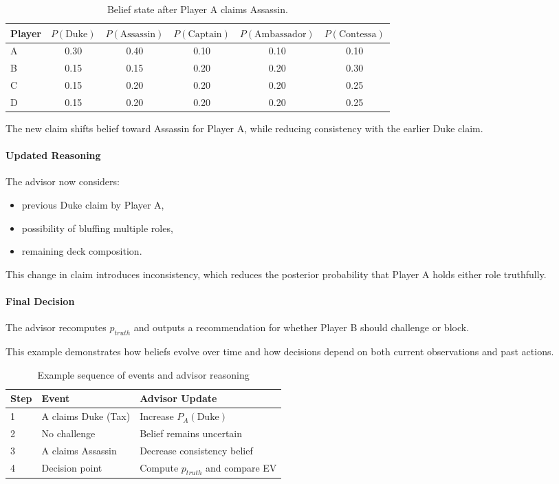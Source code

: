 \documentclass[11pt]{article}
\begin{document}
\begin{table}[H]
\centering
\caption{Belief state after Player A claims Assassin.}
\label{tab:belief-assassin}
\begin{tabular}{lccccc}
\toprule
Player & $P(\mathrm{Duke})$ & $P(\mathrm{Assassin})$ & $P(\mathrm{Captain})$ & $P(\mathrm{Ambassador})$ & $P(\mathrm{Contessa})$ \\
\midrule
A & 0.30 & 0.40 & 0.10 & 0.10 & 0.10 \\
B & 0.15 & 0.15 & 0.20 & 0.20 & 0.30 \\
C & 0.15 & 0.20 & 0.20 & 0.20 & 0.25 \\
D & 0.15 & 0.20 & 0.20 & 0.20 & 0.25 \\
\bottomrule
\end{tabular}
\end{table}
The new claim shifts belief toward Assassin for Player A, while reducing consistency with the earlier Duke claim.

\paragraph{Updated Reasoning}
The advisor now considers:
\begin{itemize}
    \item previous Duke claim by Player A,
    \item possibility of bluffing multiple roles,
    \item remaining deck composition.
\end{itemize}

This change in claim introduces inconsistency, which reduces the posterior probability that Player A holds either role truthfully.

\paragraph{Final Decision}
The advisor recomputes $p_{truth}$ and outputs a recommendation for whether Player B should challenge or block.

This example demonstrates how beliefs evolve over time and how decisions depend on both current observations and past actions.

\begin{table}[h]
\centering
\begin{tabular}{l l l}
\hline
Step & Event & Advisor Update \\
\hline
1 & A claims Duke (Tax) & Increase $P_A(\mathrm{Duke})$ \\
2 & No challenge & Belief remains uncertain \\
3 & A claims Assassin & Decrease consistency belief \\
4 & Decision point & Compute $p_{truth}$ and compare EV \\
\hline
\end{tabular}
\caption{Example sequence of events and advisor reasoning}
\end{table}
\end{document}
